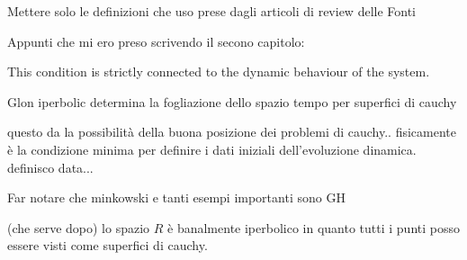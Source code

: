 \documentclass[Main]{subfiles}
\begin{document}
			\begin{Warning}
				Mettere solo le definizioni che uso prese dagli articoli di review delle Fonti
			\end{Warning}	
			Appunti che mi ero preso scrivendo il secono capitolo:
					
			This condition is strictly connected to the dynamic behaviour of the system.
	
		Glon iperbolic determina la fogliazione dello spazio tempo per superfici di cauchy
		
		questo da la possibilità della buona posizione dei problemi di cauchy.. fisicamente è la condizione minima per definire i dati iniziali dell'evoluzione dinamica.
		definisco data...			
		
		\begin{Warning}
			Far notare che minkowski e tanti esempi importanti sono GH
		\end{Warning}
		
		\begin{observation}
		(che serve dopo) lo spazio $R$ è banalmente iperbolico in quanto tutti i punti posso essere visti come superfici di cauchy.
		\end{observation}
		
\end{document}
